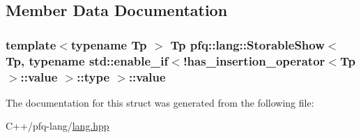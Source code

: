 \subsection{Member Data Documentation}
\hypertarget{structpfq_1_1lang_1_1StorableShow_3_01Tp_00_01typename_01std_1_1enable__if_3_9has__insertion__op9c58e317fa180887b2f1b929c60377c7_aa146b1fdbba871846c7a2b4bdc997a4b}{
\subsubsection[{value}]{\setlength{\rightskip}{0pt plus 5cm}template$<$typename Tp $>$ Tp {\bf pfq\+::lang\+::\+Storable\+Show}$<$ Tp, typename std\+::enable\+\_\+if$<$!{\bf has\+\_\+insertion\+\_\+operator}$<$Tp $>$\+::value $>$\+::type $>$\+::value}}\label{structpfq_1_1lang_1_1StorableShow_3_01Tp_00_01typename_01std_1_1enable__if_3_9has__insertion__op9c58e317fa180887b2f1b929c60377c7_aa146b1fdbba871846c7a2b4bdc997a4b}


The documentation for this struct was generated from the following file\+:\begin{DoxyCompactItemize}
\item 
C++/pfq-\/lang/\hyperlink{lang_8hpp}{lang.\+hpp}\end{DoxyCompactItemize}
